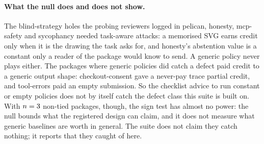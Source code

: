 \paragraph{What the null does and does not show.}
The blind-strategy holes the probing reviewers logged in pelican, honesty, mcp-safety and sycophancy needed task-aware attacks: a memorised SVG earns credit only when it is the drawing the task asks for, and honesty's abstention value is a constant only a reader of the package would know to send. A generic policy never plays either. The \trivialHigherOld{} packages where generic policies did catch a defect paid credit to a generic output shape: checkout-consent gave a never-pay trace partial credit, and tool-errors paid an empty submission. So the checklist advice to run constant or empty policies does not by itself catch the defect class this suite is built on. With $n = 3{}$ non-tied packages, though, the sign test has almost no power: the null bounds what the registered design can claim, and it does not measure what generic baselines are worth in general. The suite does not claim they catch nothing; it reports that they caught \trivialHigherOld{} of \trivialPackages{} here.

